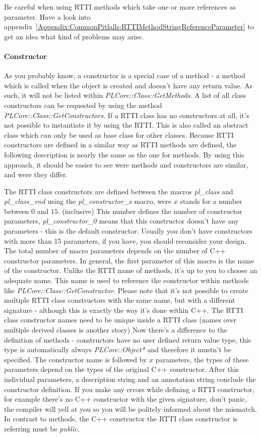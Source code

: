 Be careful when using \ac{RTTI} methods which take one or more references as parameter. Have a look into appendix~\ref{Appendix:CommonPitfalls:RTTIMethodStringReferenceParameter} to get an idea what kind of problems may arise.


\paragraph{Constructor}
\label{ClassMembers:Constructor}
As you probably know, a constructor is a special case of a method - a method which is called when the object is created and doesn't have any return value. As such, it will not be listed within \emph{PLCore::Class::GetMethods}. A list of all class constructors can be requested by using the method \emph{PLCore::Class::GetConstructors}. If a \ac{RTTI} class has no constructors at all, it's not possible to instantiate it by using the \ac{RTTI}. This is also called an abstract class which can only be used as base class for other classes. Because \ac{RTTI} constructors are defined in a similar way as \ac{RTTI} methods are defined, the following description is nearly the same as the one for methods. By using this approach, it should be easier to see were methods and constructors are similar, and were they differ.

The \ac{RTTI} class constructors are defined between the macros \emph{pl\_class} and \emph{pl\_class\_end} using the \emph{pl\_constructor\_x} macro, were $x$ stands for a number between $0$ and $15$. (inclusive) This number defines the number of constructor parameters, \emph{pl\_constructor\_0} means that this constructor doesn't have any parameters - this is the default constructor. Usually you don't have constructors with more than 15 parameters, if you have, you should reconsider your design. The total number of macro parameters depends on the number of C++ constructor parameters. In general, the first parameter of this macro is the name of the constructor. Unlike the \ac{RTTI} name of methods, it's up to you to choose an adequate name. This name is used to reference the constructor within methods like \emph{PLCore::Class::GetConstructor}. Please note that it's not possible to create multiple \ac{RTTI} class constructors with the same name, but with a different signature - although this is exactly the way it's done within C++. The \ac{RTTI} class constructor names need to be unique inside a \ac{RTTI} class (names over multiple derived classes is another story) Now there's a difference to the definition of methods - constructors have no user defined return value type, this type is automatically always \emph{PLCore::Object*} and therefore it mustn't be specified. The constructor name is followed by $x$ parameters, the types of these parameters depend on the types of the original C++ constructor. After this individual parameters, a description string and an annotation string conclude the constructor definition. If you make any errors while defining a \ac{RTTI} constructor, for example there's no C++ constructor with the given signature, don't panic, the compiler will yell at you so you will be politely informed about the mismatch. In contrast to methods, the C++ constructor the \ac{RTTI} class constructor is referring must be \emph{public}.

